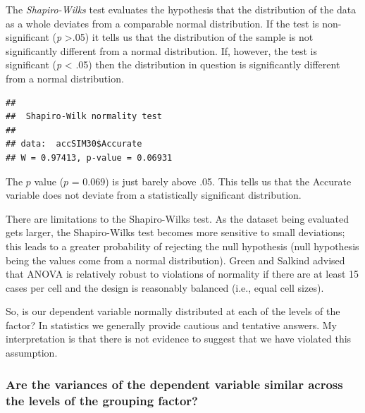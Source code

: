 \documentclass[
  english,
]{book}
\newenvironment{Shaded}{\begin{snugshade}}{\end{snugshade}}
\newcommand{\KeywordTok}[1]{\textcolor[rgb]{0.13,0.29,0.53}{\textbf{#1}}}
\newcommand{\NormalTok}[1]{#1}
\newcommand{\OperatorTok}[1]{\textcolor[rgb]{0.81,0.36,0.00}{\textbf{#1}}}
\begin{document}
The \emph{Shapiro-Wilks} test evaluates the hypothesis that the distribution of the data as a whole deviates from a comparable normal distribution. If the test is non-significant (\emph{p} \textgreater.05) it tells us that the distribution of the sample is not significantly different from a normal distribution. If, however, the test is significant (\emph{p} \textless{} .05) then the distribution in question is significantly different from a normal distribution.

\begin{Shaded}
\end{Shaded}

\begin{verbatim}
## 
##  Shapiro-Wilk normality test
## 
## data:  accSIM30$Accurate
## W = 0.97413, p-value = 0.06931
\end{verbatim}

The \(p\) value (\(p\) = 0.069) is just barely above .05. This tells us that the Accurate variable does not deviate from a statistically significant distribution.

There are limitations to the Shapiro-Wilks test. As the dataset being evaluated gets larger, the Shapiro-Wilks test becomes more sensitive to small deviations; this leads to a greater probability of rejecting the null hypothesis (null hypothesis being the values come from a normal distribution). Green and Salkind \citeyearpar{green_using_2014} advised that ANOVA is relatively robust to violations of normality if there are at least 15 cases per cell and the design is reasonably balanced (i.e., equal cell sizes).

So, is our dependent variable normally distributed at each of the levels of the factor? In statistics we generally provide cautious and tentative answers. My interpretation is that there is not evidence to suggest that we have violated this assumption.

\hypertarget{are-the-variances-of-the-dependent-variable-similar-across-the-levels-of-the-grouping-factor}{%
\subsubsection{Are the variances of the dependent variable similar across the levels of the grouping factor?}\label{are-the-variances-of-the-dependent-variable-similar-across-the-levels-of-the-grouping-factor}}
\end{document}
